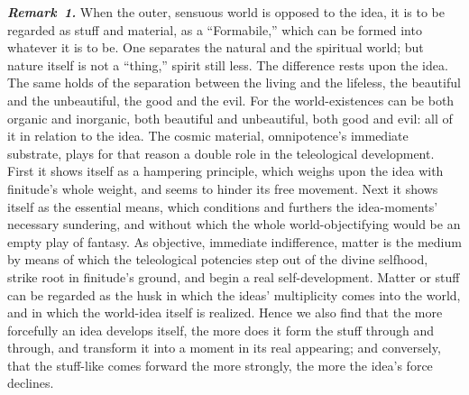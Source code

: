 \documentclass[12pt]{book}
\newcommand{\anm}[1]{\emph{\textbf{Remark~#1.}}}
\begin{document}
\anm{1} When the outer, sensuous world is opposed to the idea, it is to be
regarded as stuff and material, as a ``Formabile,'' which can be formed into
whatever it is to be. One separates the natural and the spiritual world; but
nature itself is not a ``thing,'' spirit still less. The difference rests
upon the idea. The same holds of the separation between the living and the
lifeless, the beautiful and the unbeautiful, the good and the evil. For the
world-existences can be both organic and inorganic, both beautiful and
unbeautiful, both good and evil: all of it in relation to the idea. The
cosmic material, omnipotence's immediate substrate, plays for that reason a
double role in the teleological development. First it shows itself as a
hampering principle, which weighs upon the idea with finitude's whole
weight, and seems to hinder its free movement. Next it shows itself as the
essential means, which conditions and furthers the idea-moments' necessary
sundering, and without which the whole world-objectifying would be an empty
play of fantasy. As objective, immediate indifference, matter is the medium
by means of which the teleological potencies step out of the divine
selfhood, strike root in finitude's ground, and begin a real
self-development. Matter or stuff can be regarded as the husk in which the
ideas' multiplicity comes into the world, and in which the world-idea itself
is realized. Hence we also find that the more forcefully an idea develops
itself, the more does it form the stuff through and through, and transform
it into a moment in its real appearing; and conversely, that the stuff-like
comes forward the more strongly, the more the idea's force declines.
\end{document}
